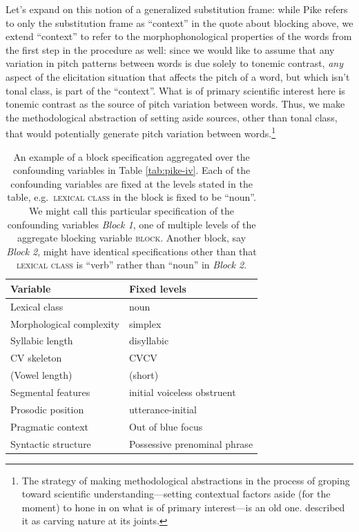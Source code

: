 \documentclass[12pt]{article}
\begin{document}
Let's expand on this notion of a generalized substitution frame:
while Pike refers to only the substitution frame as ``context'' in the
quote about blocking above, we extend ``context'' to refer to the
morphophonological properties of the words from the first step in the
procedure as well: since we would like to assume that any variation in
pitch patterns between words is due solely to tonemic contrast,
\textit{any} aspect of the elicitation situation that affects the
pitch of a word, but which isn't tonal class, is part of the
``context''. What is of primary scientific interest here is tonemic
contrast as the source of pitch variation between words. Thus, we make
the methodological abstraction of setting aside sources, other than
tonal class, that would potentially generate pitch variation between
words.\footnote{The strategy of making methodological abstractions in
the process of groping toward scientific understanding---setting
contextual factors aside (for the moment) to hone in on what is of
primary interest---is an old one. \citet{Plato:360} described it as
carving nature at its joints.}
 

\begin{table}[!h]
  \centering
  \begin{tabular}{l | l}
    Variable & Fixed levels\\\hline
    Lexical class &  noun\\
    Morphological complexity &  simplex\\
    Syllabic length & disyllabic\\
    CV skeleton &  CVCV\\
    (Vowel length) &  (short)\\
    Segmental features &  initial voiceless obstruent\\\hline
    Prosodic position &  utterance-initial\\
    Pragmatic context &  Out of blue focus\\
    Syntactic structure &  Possessive prenominal phrase\\
  \end{tabular}
  \caption{An example of a block specification aggregated over the
    confounding variables in Table \ref{tab:pike-iv}. Each of the
    confounding variables are fixed at the levels stated in the
    table, e.g.\ \textsc{lexical class} in the block is fixed to be ``noun''. We might call
    this particular specification of the confounding variables \textit{Block 1}, one of multiple levels of the aggregate
    blocking variable \textsc{block}. Another block, say \textit{Block
    2}, might have identical specifications other than that
  \textsc{lexical class} is ``verb'' rather than ``noun''  in \textit{Block 2}.}
  \label{tab:pike-block}
\end{table}
\end{document}

